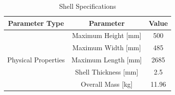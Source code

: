 \documentclass[main.tex]{subfiles}
\begin{document}
\begin{table}
\centering
  \begin{tabular}{@{}ccc@{}} \toprule
    Parameter Type & Parameter & Value \\ \midrule
    \multirow{5}{4em}{Physical Properties} & Maximum Height [\si{mm}] & 500 \\
    & Maximum Width [\si{mm}] & 485 \\
    & Maximum Length [\si{mm}] & 2685 \\
    & Shell Thickness [\si{mm}] & 2.5 \\
    & Overall Mass [\si{kg}] & 11.96 \\
    \bottomrule
  \end{tabular}
  \caption{Shell Specifications}
  \label{table:shelltable}
\end{table}
\end{document}
